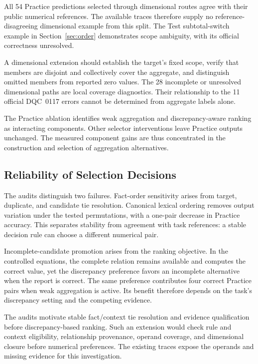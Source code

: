 \documentclass[conference]{IEEEtran}
\begin{document}
All 54 Practice predictions selected through dimensional routes agree with their public numerical references. The available traces therefore supply no reference-disagreeing dimensional example from this split. The Test subtotal-switch example in Section~\ref{sec:order} demonstrates scope ambiguity, with its official correctness unresolved.

A dimensional extension should establish the target's fixed scope, verify that members are disjoint and collectively cover the aggregate, and distinguish omitted members from reported zero values. The 28 incomplete or unresolved dimensional paths are local coverage diagnostics. Their relationship to the 11 official DQC~0117 errors cannot be determined from aggregate labels alone.

The Practice ablation identifies weak aggregation and discrepancy-aware ranking as interacting components. Other selector interventions leave Practice outputs unchanged. The measured component gains are thus concentrated in the construction and selection of aggregation alternatives.

\subsection{Reliability of Selection Decisions}
\label{sec:qualification}
The audits distinguish two failures. Fact-order sensitivity arises from target, duplicate, and candidate tie resolution. Canonical lexical ordering removes output variation under the tested permutations, with a one-pair decrease in Practice accuracy. This separates stability from agreement with task references: a stable decision rule can choose a different numerical pair.

Incomplete-candidate promotion arises from the ranking objective. In the controlled equations, the complete relation remains available and computes the correct value, yet the discrepancy preference favors an incomplete alternative when the report is correct. The same preference contributes four correct Practice pairs when weak aggregation is active. Its benefit therefore depends on the task's discrepancy setting and the competing evidence.

The audits motivate stable fact/context tie resolution and evidence qualification before discrepancy-based ranking. Such an extension would check rule and context eligibility, relationship provenance, operand coverage, and dimensional closure before numerical preferences. The existing traces expose the operands and missing evidence for this investigation.
\end{document}
